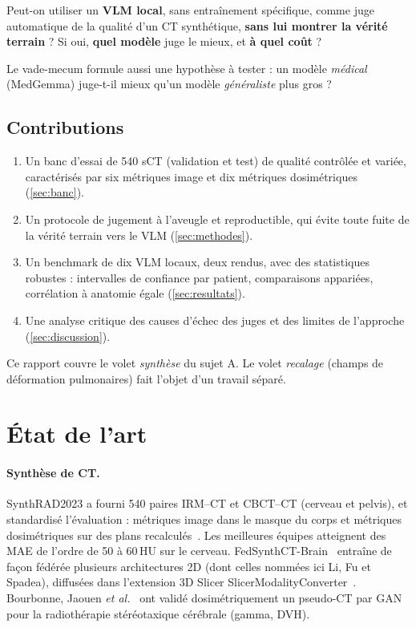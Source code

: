 \documentclass[11pt,a4paper]{article}
\begin{document}
\begin{retenir}
Peut-on utiliser un \textbf{VLM local}, sans entraînement spécifique, comme juge automatique de la qualité d'un CT synthétique, \textbf{sans lui montrer la vérité terrain} ? Si oui, \textbf{quel modèle} juge le mieux, et \textbf{à quel coût} ?
\end{retenir}

Le vade-mecum formule aussi une hypothèse à tester : un modèle \emph{médical} (MedGemma) juge-t-il mieux qu'un modèle \emph{généraliste} plus gros ?

\subsection{Contributions}
\begin{enumerate}
  \item Un banc d'essai de 540 sCT (validation et test) de qualité contrôlée et variée, caractérisés par six métriques image et dix métriques dosimétriques (\cref{sec:banc}).
  \item Un protocole de jugement à l'aveugle et reproductible, qui évite toute fuite de la vérité terrain vers le VLM (\cref{sec:methodes}).
  \item Un benchmark de dix VLM locaux, deux rendus, avec des statistiques robustes : intervalles de confiance par patient, comparaisons appariées, corrélation à anatomie égale (\cref{sec:resultats}).
  \item Une analyse critique des causes d'échec des juges et des limites de l'approche (\cref{sec:discussion}).
\end{enumerate}
Ce rapport couvre le volet \emph{synthèse} du sujet A. Le volet \emph{recalage} (champs de déformation pulmonaires) fait l'objet d'un travail séparé.

\section{État de l'art}
\label{sec:etat}

\paragraph{Synthèse de CT.} SynthRAD2023 a fourni 540 paires IRM--CT et CBCT--CT (cerveau et pelvis), et standardisé l'évaluation : métriques image dans le masque du corps et métriques dosimétriques sur des plans recalculés~\cite{thummerer2023synthrad,huijben2024synthrad}. Les meilleures équipes atteignent des MAE de l'ordre de 50 à 60\,HU sur le cerveau. FedSynthCT-Brain~\cite{raggio2025fedsynth} entraîne de façon fédérée plusieurs architectures 2D (dont celles nommées ici Li, Fu et Spadea), diffusées dans l'extension 3D Slicer SlicerModalityConverter~\cite{smc}. Bourbonne, Jaouen \emph{et al.}~\cite{bourbonne2021} ont validé dosimétriquement un pseudo-CT par GAN pour la radiothérapie stéréotaxique cérébrale (gamma, DVH).
\end{document}

